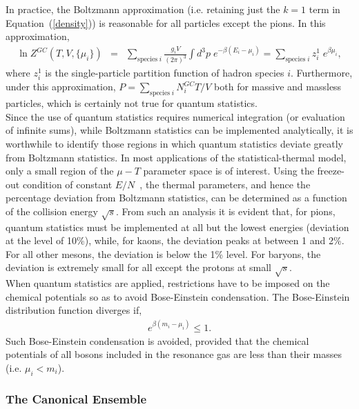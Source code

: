 \documentclass{elsarticle}
\begin{document}
In practice, the Boltzmann approximation (i.e. retaining just the 
$k=1$ term in Equation~(\ref{density})) is reasonable 
for all particles except the pions. In this approximation,
\begin{eqnarray}
\ln Z^{GC}\left(T,V,\{\mu_i\}\right) &=& \sum_{\mathrm{species}\;i}\frac{g_iV}{\left(2\pi\right)^3}\int d^3p\;e^{-\beta\left(E_i-\mu_i\right)}= \sum_{\mathrm{species}\;i} z_i^1\;e^{\beta\mu_i},
\end{eqnarray}
where $z_i^1$ is the single-particle partition function of hadron species $i$. 
Furthermore, under this approximation, 
$P=\sum_{\mathrm{species}\;i}N_i^{GC}T/V$ both for massive and massless particles, which is certainly not 
true for quantum statistics.\\ 

Since the use of quantum statistics requires numerical integration (or evaluation of 
infinite sums), while Boltzmann statistics can be implemented analytically, it 
is worthwhile to identify those regions in which quantum statistics deviate 
greatly from Boltzmann statistics. In most applications of the 
statistical-thermal model, only a small region of the $\mu-T$ parameter space is of 
interest. Using the freeze-out condition of constant $E/N$~\cite{Cleymans:1998fq,Cleymans:1999st}, the 
thermal parameters, and hence the percentage deviation from Boltzmann statistics, can be determined 
as a function of the collision energy $\sqrt{s}$. From such an analysis it is evident 
that, for pions, quantum statistics must be implemented at all 
but the lowest energies (deviation at the level of 10\%), while, for kaons, 
the deviation peaks at between 1 and 2\%. For all other mesons, the deviation is below the 1\% level. 
For baryons, the deviation is extremely small for all except the protons at small $\sqrt{s}$.\\

When quantum statistics are applied, restrictions have to be imposed on the chemical 
potentials so as to avoid Bose-Einstein condensation. The Bose-Einstein distribution 
function diverges if,
\begin{eqnarray}
e^{\beta\left(m_i-\mu_i\right)} \le 1.
\end{eqnarray}
Such Bose-Einstein condensation is avoided, provided that the 
chemical potentials of all bosons included in the resonance gas are 
less than their masses (i.e. $\mu_i<m_i$).\\  

\subsubsection{The Canonical Ensemble}\label{SubSection::Canonical}
\end{document}
